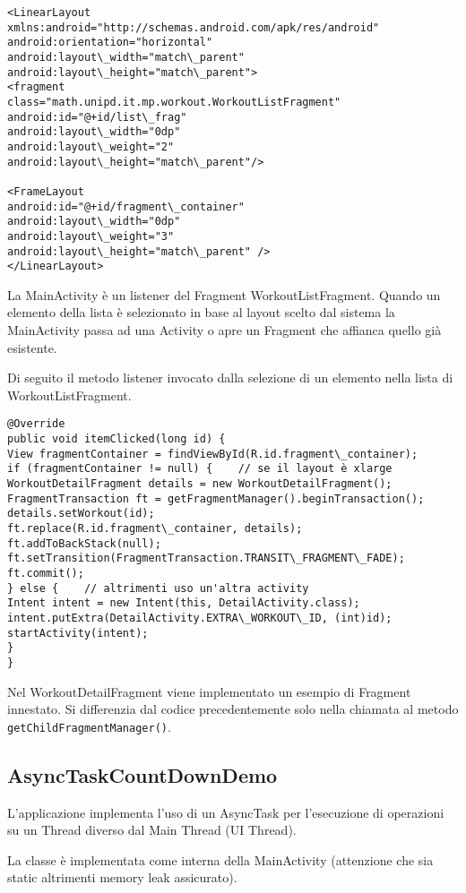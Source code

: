 \begin{lstlisting}
<LinearLayout xmlns:android="http://schemas.android.com/apk/res/android"
android:orientation="horizontal"
android:layout\_width="match\_parent"
android:layout\_height="match\_parent">
<fragment
class="math.unipd.it.mp.workout.WorkoutListFragment"
android:id="@+id/list\_frag"
android:layout\_width="0dp"
android:layout\_weight="2"
android:layout\_height="match\_parent"/>

<FrameLayout
android:id="@+id/fragment\_container"
android:layout\_width="0dp"
android:layout\_weight="3"
android:layout\_height="match\_parent" />
</LinearLayout>
\end{lstlisting}

La MainActivity è un listener del Fragment WorkoutListFragment. Quando un elemento della lista è selezionato in base al layout scelto dal sistema la MainActivity passa ad una Activity o apre un Fragment che affianca quello già esistente.

Di seguito il metodo listener invocato dalla selezione di un elemento nella lista di WorkoutListFragment.

\begin{lstlisting}
@Override
public void itemClicked(long id) {
View fragmentContainer = findViewById(R.id.fragment\_container);
if (fragmentContainer != null) {	// se il layout è xlarge
WorkoutDetailFragment details = new WorkoutDetailFragment();
FragmentTransaction ft = getFragmentManager().beginTransaction();
details.setWorkout(id);
ft.replace(R.id.fragment\_container, details);
ft.addToBackStack(null);
ft.setTransition(FragmentTransaction.TRANSIT\_FRAGMENT\_FADE);
ft.commit();
} else {	// altrimenti uso un'altra activity
Intent intent = new Intent(this, DetailActivity.class);
intent.putExtra(DetailActivity.EXTRA\_WORKOUT\_ID, (int)id);
startActivity(intent);
}
}
\end{lstlisting}

Nel WorkoutDetailFragment viene implementato un esempio di Fragment innestato. Si differenzia dal codice precedentemente solo nella chiamata al metodo \lstinline|getChildFragmentManager()|.


\subsection{AsyncTaskCountDownDemo}
L'applicazione implementa l'uso di un AsyncTask per l'esecuzione di operazioni su un Thread diverso dal Main Thread (UI Thread).

La classe è implementata come interna della MainActivity (attenzione che sia static altrimenti memory leak assicurato).

